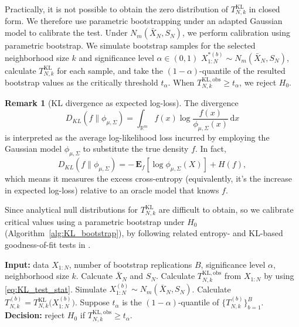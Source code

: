 \documentclass[12pt,a4paper]{article}
\newcommand{\R}{\mathbb R}
\newcommand{\E}{\mathbf {E}}
\theoremstyle{definition}
\newtheorem{remark}[definition]{Remark}
\theoremstyle{plain}
\begin{document}
{\medskip

Practically, it is not possible to obtain the zero distribution of $T_{N,k}^{\mathrm{KL}}$ in closed form. We therefore use parametric bootstrapping under an adapted Gaussian model to calibrate the test. Under $N_m(\bar{ X}_N,{{S}}_N)$, we perform calibration using parametric bootstrap. We simulate bootstrap samples for the selected neighborhood size $k$ and significance level $\alpha\in(0,1)$
$X_{1:N}^{*(b)} \sim N_m(\bar{ X}_N,{{S}}_N)$, calculate $T_{N,k}^{\mathrm{KL}}$ for each sample, and take the $(1-\alpha)$-quantile of the resulted bootstrap values as the critically threshold $t_\alpha$. When $T_{N,k}^{\mathrm{KL,obs}} \ge t_\alpha$, we reject $H_0$.

\begin{remark}[KL divergence as expected log-loss]
\label{rem:KL_risk}
The divergence
\[
D_{KL}(f\|\phi_{{\mu},{{\Sigma}}})
  = \int_{\R^m} f(x)\log\!\frac{f(x)}{\phi_{{\mu},{{\Sigma}}}(x)}\,\mathrm{d}x
\]
is interpreted as the average log-likelihood loss incurred by employing the Gaussian model $\phi_{{\mu},{{\Sigma}}}$ to substitute the true density $f$. In fact,
\[
D_{KL}(f\|\phi_{{\mu},{{\Sigma}}})
  = -\,\E_f[\log \phi_{{\mu},{{\Sigma}}}(X)] + H(f),
\]
which means it measures the excess cross-entropy (equivalently, it's the increase in expected log-loss) relative to an oracle model that knows $f$.
\end{remark}
Since analytical null distributions for $T_{N,k}^{\mathrm{KL}}$ are difficult to obtain,
so we calibrate critical values using a parametric bootstrap under $H_0$
(Algorithm~\ref{alg:KL_bootstrap}), by following related entropy- and KL-based
goodness-of-fit tests in
\cite{Song2002,GirardinLequesne2017,LequesneRegnault2020,Noughabi2013,Noughabi2019}.

\begin{algorithm}
\caption{Bootstrap calibration for $T_{N,k}^{\mathrm{KL}}$}
\label{alg:KL_bootstrap}
\begin{algorithmic}[1]
\State \textbf{Input:} data $X_{1:N}$, number of bootstrap replications $B$, significance level $\alpha$, neighborhood size $k$.
\State Calcuate $\bar{ X}_N$ and ${{S}}_N$.
\State Calculate $T_{N,k}^{\mathrm{KL,obs}}$ from $X_{1:N}$ by using \eqref{eq:KL_test_stat}.
  \State Simulate $X^{(b)}_{1:N} \sim N_m(\bar{ X}_N,{{S}}_N)$.
  \State Calculate $T_{N,k}^{(b)} = T_{N,k}^{\mathrm{KL}}\!\bigl(X^{(b)}_{1:N}\bigr)$.
\EndFor
\State Suppose $t_\alpha$ is the $(1-\alpha)$-quantile of $\{T_{N,k}^{(b)}\}_{b=1}^B$.
\State \textbf{Decision:} reject $H_0$ if $T_{N,k}^{\mathrm{KL,obs}} \ge t_\alpha$.
\end{algorithmic}
\end{algorithm}



}
\end{document}
